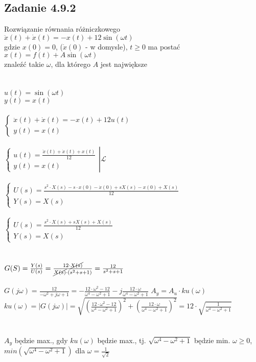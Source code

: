 \pagebreak
\subsection*{Zadanie 4.9.2} {\color{darkgray}
	Rozwiązanie równania różniczkowego\\
	$\ddot{x}(t)+\dot{x}(t)=-x(t)+12\sin({\omega t})$\\
	gdzie $x(0)=0$, ($\dot{x}(0)$ - w domysle), $t \geq 0$ ma postać\\
	$x(t)=f(t)+A\sin({\omega t})$\\
	znaleźć takie $\omega$, dla którego $A$ jest największe\\
}\lineh
\\\\
$u(t)=\sin({\omega t})$\\
$y(t)=x(t)$\\\\
$\begin{cases} \ddot{x}(t)+\dot{x}(t)=-x(t)+12u(t)\\y(t)=x(t)\end{cases}$\\\\
$\left.\begin{cases} u(t)=\frac{\ddot{x}(t)+\dot{x}(t)+x(t)}{12}\\y(t)=x(t)\end{cases}\right|\mathscr{L}$\\\\
$\begin{cases} U(s)=\frac{s^2\cdot X(s)-s\cdot x(0)-\dot{x}(0)+sX(s)-x(0)+X(s)}{12}\\Y(s)=X(s)\end{cases}$\\\\
$\begin{cases} U(s)=\frac{s^2\cdot X(s)+sX(s)+X(s)}{12}\\Y(s)=X(s)\end{cases}$\\\\\\
$G(S)=\frac{Y(s)}{U(s)}=\frac{12\cdot \cancel{X(s)}}{\cancel{X(s)}\cdot (s^2+s+1)}=\frac{12}{s^2+s+1}$\\\\
$G(j\omega)=\frac{12}{-\omega^2+j\omega+1}=-\frac{12\cdot \omega^2-12}{\omega^4-\omega^2+1}-j\frac{12\cdot \omega}{\omega^4-\omega^2+1}$
$A_y=A_u\cdot ku(\omega)$\\
$ku(\omega)=|G(j\omega)|=\sqrt{\left(\frac{12\cdot \omega^2-12}{\omega^4-\omega^2+1}\right)^2+\left(\frac{12\cdot \omega}{\omega^4-\omega^2+1}\right)^2}=12\cdot \sqrt{\frac{1}{\omega^4-\omega^2+1}}$\\\\\\
$A_y$ będzie max., gdy $ku(\omega)$ będzie max., tj. $\sqrt{\omega^4-\omega^2+1}$ będzie min.
$\omega \geq 0$, $min(\sqrt{\omega^4-\omega^2+1})$ dla $\omega=\frac{1}{\sqrt{2}}$


